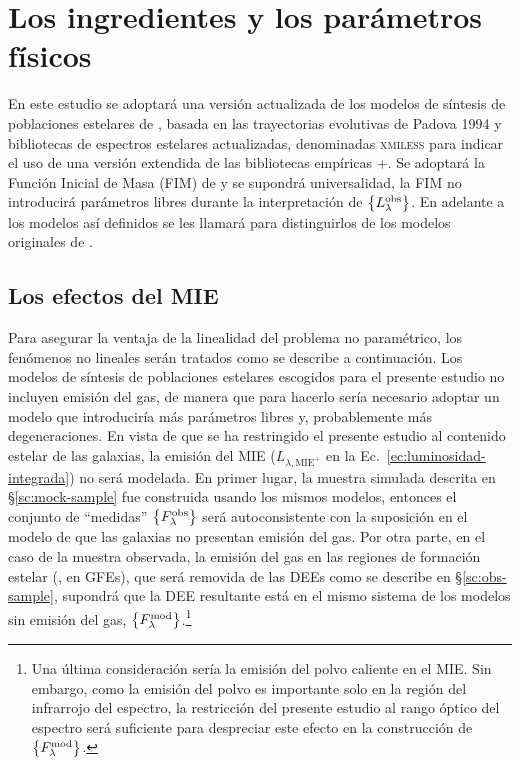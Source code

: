 
\section{Los ingredientes y los parámetros físicos}

En este estudio se adoptará una versión actualizada de los modelos de síntesis de poblaciones
estelares de , basada en las trayectorias evolutivas de Padova 1994
\citep{Alongi1993, Bressan1993, Fagotto1994a, Fagotto1994b, Girardi1996} y bibliotecas de espectros
estelares actualizadas, denominadas \textsc{xmiless} para indicar el uso de una versión extendida de
las bibliotecas empíricas \miles{}$+$\stelib \citep{SanchezBlazquez2006, LeBorgne2003}. Se adoptará
la Función Inicial de Masa (FIM) de \citet{Chabrier2003} y se supondrá universalidad, \ie la FIM no
introducirá parámetros libres durante la interpretación de $\set{\sedt{obs}}$. En adelante a los
modelos así definidos se les llamará  para distinguirlos de los modelos originales de \bc.

\subsection{Los efectos del MIE}

Para asegurar la ventaja de la linealidad del problema no paramétrico, los fenómenos no lineales
serán tratados como se describe a continuación. Los modelos de síntesis de poblaciones estelares
escogidos para el presente estudio no incluyen emisión del gas, de manera que para hacerlo sería
necesario adoptar un modelo \citep[\eg,][]{Charlot2001} que introduciría más parámetros libres y,
probablemente más degeneraciones. En vista de que se ha restringido el presente estudio al contenido
estelar de las galaxias, la emisión del MIE ($L_{\lambda,\text{MIE}^+}$ en la
Ec.~\ref{ec:luminosidad-integrada}) no será modelada. En primer lugar, la muestra simulada descrita
en \S\ref{sc:mock-sample} fue construida usando los mismos modelos, entonces el conjunto de
``medidas'' $\set{\sedt[F]{obs}}$ será autoconsistente con la suposición en el modelo de que las
galaxias no presentan emisión del gas. Por otra parte, en el caso de la muestra observada, la
emisión del gas en las regiones de formación estelar (\eg, en GFEs), que será removida de las DEEs
como se describe en \S\ref{sc:obs-sample}, supondrá que la DEE resultante está en el mismo sistema
de los modelos sin emisión del gas, $\set{\sedt[F]{mod}}$.\footnote{Una última consideración sería
la emisión del polvo caliente en el MIE. Sin embargo, como la emisión del polvo es importante solo
en la región del infrarrojo del espectro, la restricción del presente estudio al rango óptico del
espectro será suficiente para despreciar este efecto en la construcción de $\set{\sedt[F]{mod}}$.}


